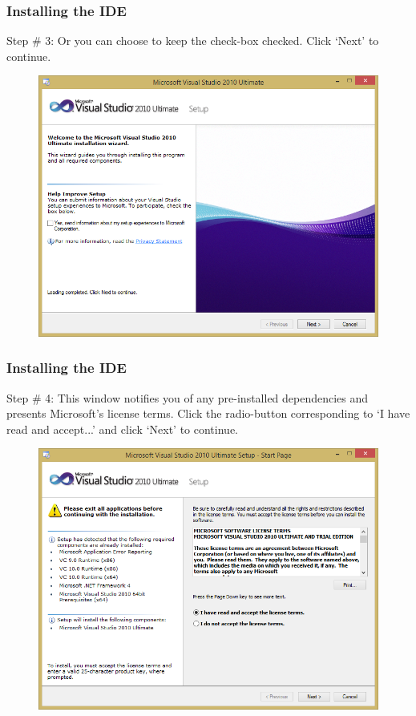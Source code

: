 \documentclass{beamer}
\begin{document}
\begin{frame}
    \frametitle{Installing the IDE}
    Step \# 3: Or you can choose to keep the check-box checked. Click `Next' to continue.
    \begin{figure}
        \centering
        \includegraphics[scale=0.39]{step_2}
    \end{figure}
\end{frame}

\begin{frame}
    \frametitle{Installing the IDE}
    Step \# 4: This window notifies you of any pre-installed dependencies and presents Microsoft's license terms. Click the radio-button corresponding to `I have read and accept...' and click `Next' to continue.
    \begin{figure}
        \centering
        \includegraphics[scale=0.39]{step_3}
    \end{figure}
\end{frame}
\end{document}
